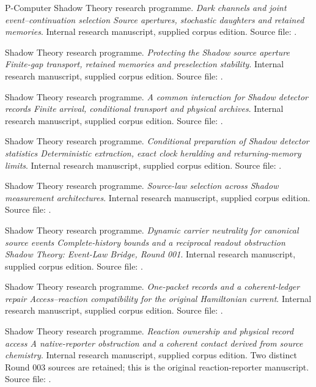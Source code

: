 \documentclass[11pt,oneside,openany]{book}
\theoremstyle{definition}
\theoremstyle{remark}\newtheorem{remark}[theorem]{Remark}
\begin{document}
\begin{thebibliography}{P-Computer}
Shadow Theory research programme.
\emph{Dark channels and joint event--continuation selection Source apertures, stochastic daughters and retained memories}.
Internal research manuscript, supplied corpus edition.
Source file: .

Shadow Theory research programme.
\emph{Protecting the Shadow source aperture Finite-gap transport, retained memories and preselection stability}.
Internal research manuscript, supplied corpus edition.
Source file: .

Shadow Theory research programme.
\emph{A common interaction for Shadow detector records Finite arrival, conditional transport and physical archives}.
Internal research manuscript, supplied corpus edition.
Source file: .

Shadow Theory research programme.
\emph{Conditional preparation of Shadow detector statistics Deterministic extraction, exact clock heralding and returning-memory limits}.
Internal research manuscript, supplied corpus edition.
Source file: .

Shadow Theory research programme.
\emph{Source-law selection across Shadow measurement architectures}.
Internal research manuscript, supplied corpus edition.
Source file: .

Shadow Theory research programme.
\emph{Dynamic carrier neutrality for canonical source events Complete-history bounds and a reciprocal readout obstruction Shadow Theory: Event-Law Bridge, Round 001}.
Internal research manuscript, supplied corpus edition.
Source file: .

Shadow Theory research programme.
\emph{One-packet records and a coherent-ledger repair Access--reaction compatibility for the original Hamiltonian current}.
Internal research manuscript, supplied corpus edition.
Source file: .

Shadow Theory research programme.
\emph{Reaction ownership and physical record access A native-reporter obstruction and a coherent contact derived from source chemistry}.
Internal research manuscript, supplied corpus edition.
Two distinct Round 003 sources are retained; this is the original reaction-reporter manuscript.
Source file: .


\end{thebibliography}
\end{document}
